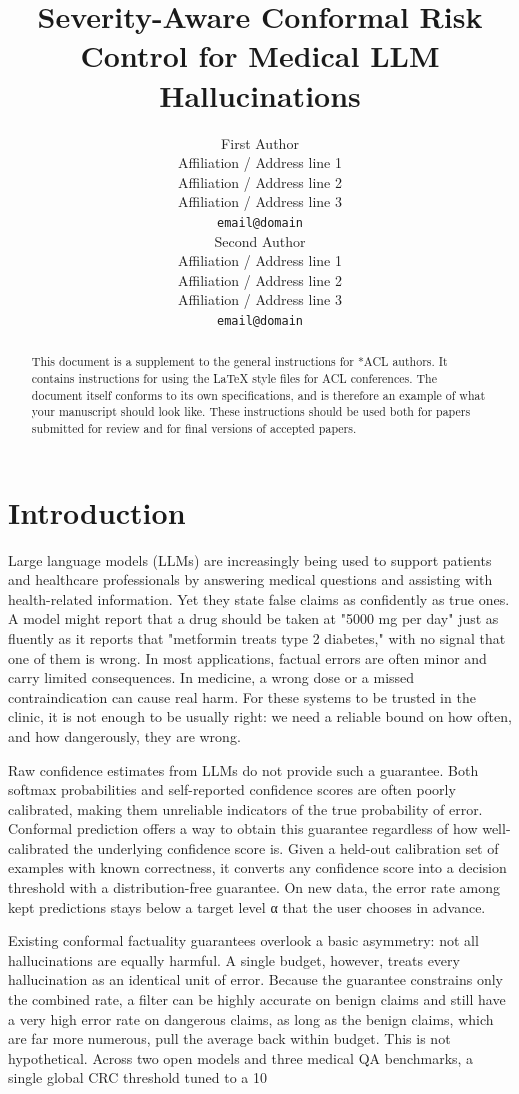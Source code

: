 \documentclass[11pt]{article}
\title{Severity-Aware Conformal Risk Control for Medical LLM Hallucinations}
\author{First Author \\
  Affiliation / Address line 1 \\
  Affiliation / Address line 2 \\
  Affiliation / Address line 3 \\
  \texttt{email@domain} \\\And
  Second Author \\
  Affiliation / Address line 1 \\
  Affiliation / Address line 2 \\
  Affiliation / Address line 3 \\
  \texttt{email@domain} \\}
\begin{document}
\maketitle
\begin{abstract}
This document is a supplement to the general instructions for *ACL authors. It contains instructions for using the \LaTeX{} style files for ACL conferences.
The document itself conforms to its own specifications, and is therefore an example of what your manuscript should look like.
These instructions should be used both for papers submitted for review and for final versions of accepted papers.
\end{abstract}

\section{Introduction}
Large language models (LLMs) are increasingly being used to support patients and healthcare professionals by answering medical questions and assisting with health-related information. Yet they state false claims as confidently as true ones. A model might report that a drug should be taken at "5000 mg per day" just as fluently as it reports that "metformin treats type 2 diabetes," with no signal that one of them is wrong. In most applications, factual errors are often minor and carry limited consequences. In medicine, a wrong dose or a missed contraindication can cause real harm. For these systems to be trusted in the clinic, it is not enough to be usually right: we need a reliable bound on how often, and how dangerously, they are wrong.

Raw confidence estimates from LLMs do not provide such a guarantee. Both softmax probabilities and self-reported confidence scores are often poorly calibrated, making them unreliable indicators of the true probability of error. Conformal prediction offers a way to obtain this guarantee regardless of how well-calibrated the underlying confidence score is. Given a held-out calibration set of examples with known correctness, it converts any confidence score into a decision threshold with a distribution-free guarantee. On new data, the error rate among kept predictions stays below a target level α that the user chooses in advance.



Existing conformal factuality guarantees overlook a basic asymmetry: not all hallucinations are equally harmful. A single budget, however, treats every hallucination as an identical unit
of error. Because the guarantee constrains only the combined rate, a filter can be highly accurate on benign claims and still have a very high error rate on dangerous claims, as long as the benign claims, which are far more numerous, pull the average back within budget. This is not hypothetical. Across two open models and three medical QA benchmarks, a single global CRC threshold tuned to a 10%
\end{document}
